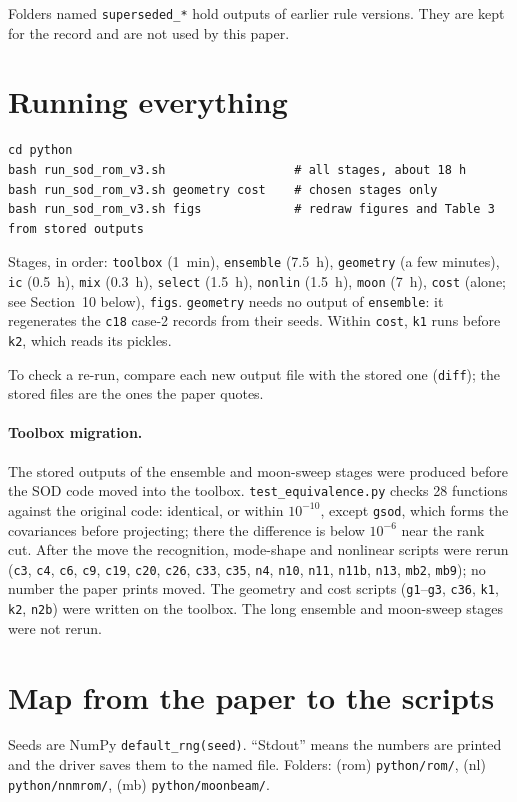 \documentclass[10pt]{article}
\newcommand{\f}[1]{\texttt{#1}}
\begin{document}
Folders named \f{superseded\_\allowbreak{}*} hold outputs of earlier rule versions. They are kept for the record and are not used by this paper.

\section{Running everything}
\begin{verbatim}
cd python
bash run_sod_rom_v3.sh                  # all stages, about 18 h
bash run_sod_rom_v3.sh geometry cost    # chosen stages only
bash run_sod_rom_v3.sh figs             # redraw figures and Table 3 from stored outputs
\end{verbatim}
Stages, in order: \f{toolbox} (1~min), \f{ensemble} (7.5~h), \f{geometry} (a few minutes), \f{ic} (0.5~h), \f{mix} (0.3~h), \f{select} (1.5~h), \f{nonlin} (1.5~h), \f{moon} (7~h), \f{cost} (alone; see Section~10 below), \f{figs}.
\f{geometry} needs no output of \f{ensemble}: it regenerates the \f{c18} case-2 records from their seeds.
Within \f{cost}, \f{k1} runs before \f{k2}, which reads its pickles.

To check a re-run, compare each new output file with the stored one (\f{diff}); the stored files are the ones the paper quotes.

\paragraph{Toolbox migration.} The stored outputs of the ensemble and moon-sweep stages were produced before the SOD code moved into the toolbox. \f{test\_\allowbreak{}equivalence.py} checks 28 functions against the original code: identical, or within $10^{-10}$, except \f{gsod}, which forms the covariances before projecting; there the difference is below $10^{-6}$ near the rank cut. After the move the recognition, mode-shape and nonlinear scripts were rerun (\f{c3}, \f{c4}, \f{c6}, \f{c9}, \f{c19}, \f{c20}, \f{c26}, \f{c33}, \f{c35}, \f{n4}, \f{n10}, \f{n11}, \f{n11b}, \f{n13}, \f{mb2}, \f{mb9}); no number the paper prints moved. The geometry and cost scripts (\f{g1}--\f{g3}, \f{c36}, \f{k1}, \f{k2}, \f{n2b}) were written on the toolbox. The long ensemble and moon-sweep stages were not rerun.

\section{Map from the paper to the scripts}\label{sec:map}
Seeds are NumPy \f{default\_\allowbreak{}rng(seed)}. ``Stdout'' means the numbers are printed and the driver saves them to the named file. Folders: (rom) \f{python/\allowbreak{}rom/\allowbreak{}}, (nl) \f{python/\allowbreak{}nnmrom/\allowbreak{}}, (mb) \f{python/\allowbreak{}moonbeam/\allowbreak{}}.
\end{document}

